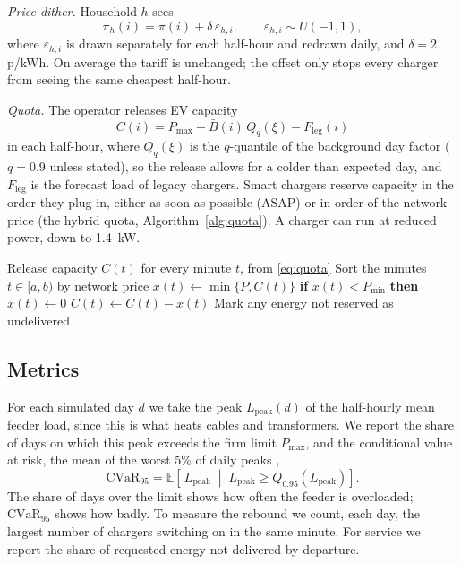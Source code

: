 \documentclass[conference]{IEEEtran}
\newcommand{\pkwh}{\,p/kWh}
\newcommand{\CVaR}{\mathrm{CVaR}}
\begin{document}
\emph{Price dither.} Household $h$ sees
\begin{equation}
\pi_h(i) = \pi(i) + \delta\,\varepsilon_{h,i}, \qquad
\varepsilon_{h,i} \sim U(-1,1),
\label{eq:dither}
\end{equation}
where $\varepsilon_{h,i}$ is drawn separately for each half-hour and redrawn
daily, and $\delta = 2$\pkwh. On average the tariff is unchanged; the offset
only stops every charger from seeing the same cheapest half-hour.

\emph{Quota.} The operator releases EV capacity
\begin{equation}
C(i) = P_{\max} - \bar{B}(i)\,Q_q(\xi) - F_{\text{leg}}(i)
\label{eq:quota}
\end{equation}
in each half-hour, where $Q_q(\xi)$ is the $q$-quantile of the background day
factor ($q = 0.9$ unless stated), so the release allows for a colder than
expected day, and $F_{\text{leg}}$ is the forecast load of legacy chargers. Smart chargers reserve capacity in the order they plug in, either
as soon as possible (ASAP) or in order of the network price (the hybrid quota,
Algorithm~\ref{alg:quota}). A charger can run at reduced power, down to
1.4~kW.

\begin{algorithm}[t]
\caption{Hybrid quota: reservation in network-price order}
\label{alg:quota}
\begin{algorithmic}[1]
\STATE Release capacity $C(t)$ for every minute $t$, from \eqref{eq:quota}
  \STATE Sort the minutes $t \in [a, b)$ by network price
    \STATE $x(t) \leftarrow \min\{P, C(t)\}$
    \STATE \textbf{if} $x(t) < P_{\min}$ \textbf{then} $x(t) \leftarrow 0$
    \STATE $C(t) \leftarrow C(t) - x(t)$
  \ENDFOR
  \STATE Mark any energy not reserved as undelivered
\ENDFOR
\end{algorithmic}
\end{algorithm}

\subsection{Metrics}

For each simulated day $d$ we take the peak $L_{\text{peak}}(d)$ of the
half-hourly mean feeder load, since this is what heats cables and
transformers. We report the share of days on which this peak exceeds the
firm limit $P_{\max}$, and the conditional value at risk, the mean of the
worst 5\% of daily peaks \cite{rockafellar2000},
\begin{equation}
\CVaR_{95} = \mathbb{E}\left[\,L_{\text{peak}} \;\middle|\;
L_{\text{peak}} \ge Q_{0.95}(L_{\text{peak}})\right].
\label{eq:cvar}
\end{equation}
The share of days over the limit shows how often the feeder is overloaded;
$\CVaR_{95}$ shows how badly. To measure the rebound we count, each day, the largest
number of chargers switching on in the same minute. For service we report the
share of requested energy not delivered by departure.
\end{document}
